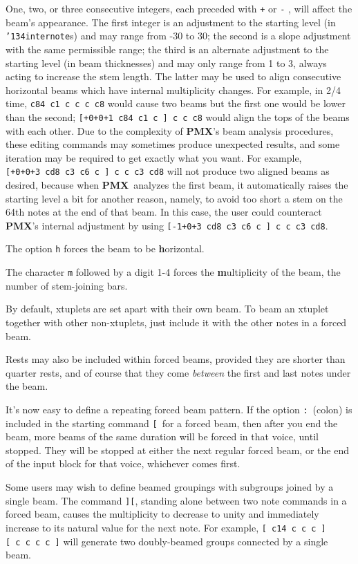 \documentclass[11pt]{article}
\def\bs{{\tt\char'134}}
\newcommand\PMXX{\textbf{PMX}}
\newcommand\PMX{\PMXX~}
\def\newfrom{2.59}  %
\def\NEW#1{\ifdim#1 pt<\newfrom pt\else%
\marginpar{\fbox{#1}}\fi}
\begin{document}
One, two, or three consecutive integers, each preceded with {\tt +} 
or {\tt -} , will affect the beam's appearance.  The first integer is 
an adjustment to the starting level (in \bs{\tt internote}s) and may range 
from -30 to 30; the second is a slope adjustment with the same 
permissible range; the third is an alternate adjustment to the 
starting level (in beam thicknesses) and may only range from 1 to 3, 
always acting to increase the stem length.  The latter may be used to 
align consecutive horizontal beams which have internal multiplicity 
changes.  For example, in 2/4 time, {\tt c84~c1~c~c~c~c8} would cause two 
beams but the 
first one would be lower than the second; {\tt [+0+0+1~c84~c1~c~]~c~c~c8}
would align the tops of the beams with each other.  Due to the 
complexity of \PMXX 's beam analysis procedures, these editing commands 
may sometimes produce unexpected results, and some iteration may be 
required to get exactly what you want.  For example, 
{\tt [+0+0+3~cd8~c3~c6~c~]~c~c~c3~cd8} 
will not produce two aligned beams as desired, because 
when \PMX analyzes the first beam, it automatically raises the starting 
level a bit for another reason, namely, to avoid too short a stem on 
the 64th notes at the end of that beam.  In this case, 
the user could counteract \PMXX 's internal adjustment by using 
{\tt [-1+0+3~cd8~c3~c6~c~]~c~c~c3~cd8}.

The option {\tt h} forces the beam to be {\bf h}orizontal.

The character {\tt m} followed by a digit 1-4 forces the {\bf m}ultiplicity 
of the beam, the number of stem-joining bars.  

        By default, xtuplets are set apart with their own beam.  To beam 
an xtuplet together with other non-xtuplets, just include it with the 
other notes in a forced beam.

        Rests may also be included within forced beams, provided they are 
shorter than quarter rests, and of course that they come {\it between} the first
and last notes under the beam.

It's \NEW{2.5} now easy to define a repeating forced beam pattern. 
If the option {\tt :}~(colon) is included in the starting command {\tt [}~for 
a forced beam, then after you end the beam, more beams of the same duration 
will be forced in 
that voice, until stopped. They will be stopped at either the next regular 
forced beam, or the end of the input block for that voice, whichever comes 
first.

	Some users may wish to define beamed groupings with subgroups 
joined by a single beam.  The command {\tt ][}, standing alone between two 
note commands in a forced beam, causes the multiplicity to decrease to 
unity and immediately increase to its natural value for the next note.  
For example, {\tt [~c14~c~c~c~][~c~c~c~c~]} will generate two doubly-beamed 
groups connected by a single beam.
\end{document}
